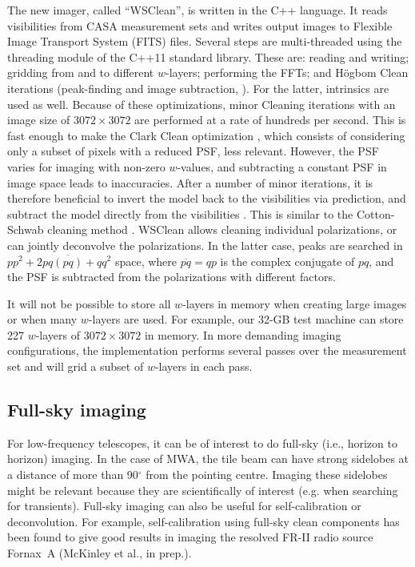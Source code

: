 \documentclass[useAMS,usenatbib]{mn2e}
\newcommand{\degree}{\ensuremath{^{\circ}}\xspace}
\begin{document}
The new imager, called ``WSClean'', is written in the C++ language. It reads visibilities from CASA measurement sets and writes output images to Flexible Image Transport System (FITS) files. Several steps are multi-threaded using the threading module of the C++11 standard library. These are: reading and writing; gridding from and to different $w$-layers; performing the FFTs; and H\"ogbom Clean iterations (peak-finding and image subtraction, \citealt{hogbom-clean}). For the latter, intrinsics are used as well. Because of these optimizations, minor Cleaning iterations with an image size of $3072\times3072$ are performed at a rate of hundreds per second. This is fast enough to make the Clark Clean optimization \citep{clark-clean}, which consists of considering only a subset of pixels with a reduced PSF, less relevant. However, the PSF varies for imaging with non-zero $w$-values, and subtracting a constant PSF in image space leads to inaccuracies. After a number of minor iterations, it is therefore beneficial to invert the model back to the visibilities via prediction, and subtract the model directly from the visibilities \citep{wprojection-cornwell}. This is similar to the Cotton-Schwab cleaning method \citep{cotton-schwab-clean}. WSClean allows cleaning individual polarizations, or can jointly deconvolve the polarizations. In the latter case, peaks are searched in $pp^2+2pq \overline{(pq)} + qq^2$ space, where $\overline{pq}=qp$ is the complex conjugate of $pq$, and the PSF is subtracted from the polarizations with different factors.

It will not be possible to store all $w$-layers in memory when creating large images or when many $w$-layers are used. For example, our 32-GB test machine can store 227 $w$-layers of $3072\times3072$ in memory. In more demanding imaging configurations, the implementation performs several passes over the measurement set and will grid a subset of $w$-layers in each pass.

\subsection{Full-sky imaging}
For low-frequency telescopes, it can be of interest to do full-sky (i.e., horizon to horizon) imaging. In the case of MWA, the tile beam can have strong sidelobes at a distance of more than 90\degree from the pointing centre. Imaging these sidelobes might be relevant because they are scientifically of interest (e.g. when searching for transients). Full-sky imaging can also be useful for self-calibration or deconvolution. For example, self-calibration using full-sky clean components has been found to give good results in imaging the resolved FR-II radio source Fornax~A (McKinley et al., in prep.).
\end{document}
